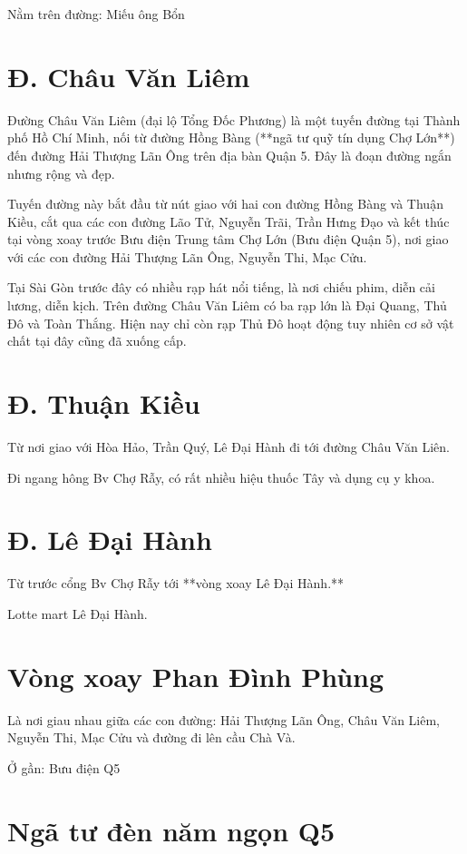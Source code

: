 Nằm trên đường: Miếu ông Bổn

\section{Đ. Châu Văn Liêm}

Đường Châu Văn Liêm (đại lộ Tổng Đốc Phương) là một tuyến đường tại Thành phố Hồ Chí Minh, nối từ đường Hồng Bàng (**ngã tư quỹ tín dụng Chợ Lớn**) đến đường Hải Thượng Lãn Ông trên địa bàn Quận 5. Đây là đoạn đường ngắn nhưng rộng và đẹp.

Tuyến đường này bắt đầu từ nút giao với hai con đường Hồng Bàng và Thuận Kiều, cắt qua các con đường Lão Tử, Nguyễn Trãi, Trần Hưng Đạo và kết thúc tại vòng xoay trước Bưu điện Trung tâm Chợ Lớn (Bưu điện Quận 5), nơi giao với các con đường Hải Thượng Lãn Ông, Nguyễn Thi, Mạc Cửu.

Tại Sài Gòn trước đây có nhiều rạp hát nổi tiếng, là nơi chiếu phim, diễn cải lương, diễn kịch. Trên đường Châu Văn Liêm có ba rạp lớn là Đại Quang, Thủ Đô và Toàn Thắng. Hiện nay chỉ còn rạp Thủ Đô hoạt động tuy nhiên cơ sở vật chất tại đây cũng đã xuống cấp.

\section{Đ. Thuận Kiều}

Từ nơi giao với Hòa Hảo, Trần Quý, Lê Đại Hành đi tới đường Châu Văn Liên.

Đi ngang hông Bv Chợ Rẫy, có rất nhiều hiệu thuốc Tây và dụng cụ y khoa.

\section{Đ. Lê Đại Hành}

Từ trước cổng Bv Chợ Rẫy tới **vòng xoay Lê Đại Hành.**

Lotte mart Lê Đại Hành.

\section{Vòng xoay Phan Đình Phùng}

Là nơi giau nhau giữa các con đường: Hải Thượng Lãn Ông, Châu Văn Liêm, Nguyễn Thi, Mạc Cửu và đường đi lên cầu Chà Và.

Ở gần: Bưu điện Q5

\section{Ngã tư đèn năm ngọn Q5}

